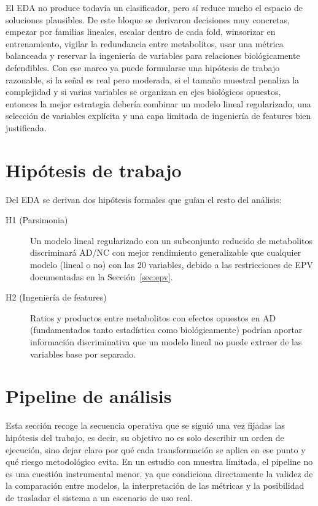 El EDA no produce todavía un clasificador, pero sí reduce mucho el espacio de soluciones plausibles. De este bloque se
derivaron decisiones muy concretas, empezar por familias lineales, escalar dentro de cada fold, winsorizar en
entrenamiento, vigilar la redundancia entre metabolitos, usar una métrica balanceada y reservar la ingeniería de
variables para relaciones biológicamente defendibles. Con ese marco ya puede formularse una hipótesis de trabajo
razonable, si la señal es real pero moderada, si el tamaño muestral penaliza la complejidad y si varias variables se
organizan en ejes biológicos opuestos, entonces la mejor estrategia debería combinar un modelo lineal regularizado, una
selección de variables explícita y una capa limitada de ingeniería de features bien justificada.

\section{Hipótesis de trabajo}\label{sec:hipotesis}

Del EDA se derivan dos hipótesis formales que guían el resto del análisis:

\begin{description}
    \item[H1 (Parsimonia)] Un modelo lineal regularizado con un subconjunto reducido de metabolitos discriminará AD/NC
     con mejor rendimiento generalizable que cualquier modelo (lineal o no) con las 20 variables,
     debido a las restricciones de EPV documentadas en la Sección~\ref{sec:epv}.

    \item[H2 (Ingeniería de features)] Ratios y productos entre metabolitos con efectos opuestos en AD (fundamentados
    tanto estadística como biológicamente) podrían aportar información discriminativa
    que un modelo lineal no puede extraer de las variables base por separado.
\end{description}

\section{Pipeline de análisis}\label{sec:pipeline}

Esta sección recoge la secuencia operativa que se siguió una vez fijadas las hipótesis del trabajo, es decir, su
objetivo no es solo describir un orden de ejecución, sino dejar claro por qué cada transformación se aplica en ese punto
y qué riesgo metodológico evita. En un estudio con muestra limitada, el pipeline no es una cuestión instrumental menor,
ya que condiciona directamente la validez de la comparación entre modelos, la interpretación de las métricas y la
posibilidad de trasladar el sistema a un escenario de uso real.

